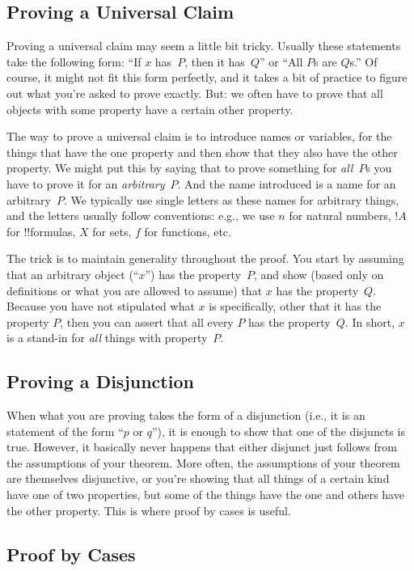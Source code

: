 \documentclass[../../../include/open-logic-section]{subfiles}
\begin{document}
\subsection{Proving a Universal Claim}

Proving a universal claim may seem a little bit tricky. Usually these
statements take the following form: ``If $x$ has~$P$, then it
has~$Q$'' or ``All $P$s are $Q$s.'' Of course, it might not fit this
form perfectly, and it takes a bit of practice to figure out what
you're asked to prove exactly. But: we often have to prove that all objects
with some property have a certain other property.

The way to prove a universal claim is to introduce names or variables,
for the things that have the one property and then show that they also
have the other property.  We might put this by saying that to prove
something for \emph{all}~$P$s you have to prove it for an
\emph{arbitrary}~$P$. And the name introduced is a name for an
arbitrary~$P$.  We typically use single letters as these names for
arbitrary things, and the letters usually follow conventions: e.g., we
use $n$ for natural numbers, $!A$ for !!{formula}s, $X$ for sets, $f$
for functions, etc.

The trick is to maintain generality throughout the proof. You start by
assuming that an arbitrary object (``$x$'') has the property~$P$, and
show (based only on definitions or what you are allowed to assume)
that $x$ has the property~$Q$. Because you have not stipulated what
$x$ is specifically, other that it has the property $P$, then you can
assert that all every $P$ has the property~$Q$. In short, $x$ is a
stand-in for \emph{all} things with property~$P$.

\subsection{Proving a Disjunction}

When what you are proving takes the form of a disjunction (i.e., it is
an statement of the form ``$p$ or $q$''), it is enough to show that
one of the disjuncts is true.  However, it basically never happens
that either disjunct just follows from the assumptions of your
theorem. More often, the assumptions of your theorem are themselves
disjunctive, or you're showing that all things of a certain kind have
one of two properties, but some of the things have the one and others
have the other property.  This is where proof by cases is
useful.

\subsection{Proof by Cases}
\end{document}

